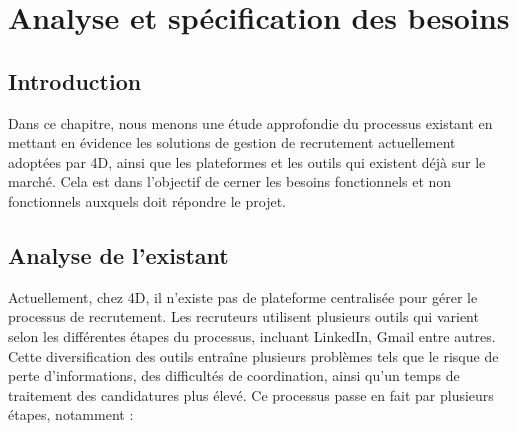 

\chapter{Analyse et spécification des besoins}
\pagestyle{chapterstyle}

\newpage
\vspace{1cm}


\section{Introduction}
Dans ce chapitre, nous menons une étude approfondie du processus existant en mettant
en évidence les solutions de gestion de recrutement actuellement adoptées par 4D, ainsi
que les plateformes et les outils qui existent déjà sur le marché. Cela est dans l’objectif
de cerner les besoins fonctionnels et non fonctionnels auxquels doit répondre le projet.

\section{Analyse de l'existant}
Actuellement, chez 4D, il n’existe pas de plateforme centralisée pour gérer le processus
de recrutement. Les recruteurs utilisent plusieurs outils qui varient selon les différentes
étapes du processus, incluant LinkedIn, Gmail entre autres. Cette diversification des outils
entraîne plusieurs problèmes tels que le risque de perte d’informations, des difficultés de
coordination, ainsi qu’un temps de traitement des candidatures plus élevé. Ce processus
passe en fait par plusieurs étapes, notamment :


